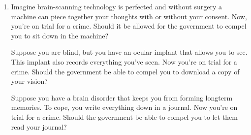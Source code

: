 \documentclass[11pt]{article}
\begin{document}
\begin{enumerate}
	\item Imagine brain-scanning technology is perfected and without surgery a machine can
		piece together your thoughts with or without your consent.  Now, you're on trial
		for a crime.  Should it be allowed for the government to compel you to sit down
		in the machine?

		Suppose you are blind, but you have an ocular implant that allows you to see.
		This implant also records everything you've seen.  Now you're on trial for a crime.
		Should the government be able to compel you to download a copy of your vision?

		Suppose you have a brain disorder that keeps you from forming longterm memories.
		To cope, you write everything down in a journal.  Now you're on trial for a crime.
		Should the government be able to compel you to let them read your journal?



	





\end{enumerate}
\end{document}
